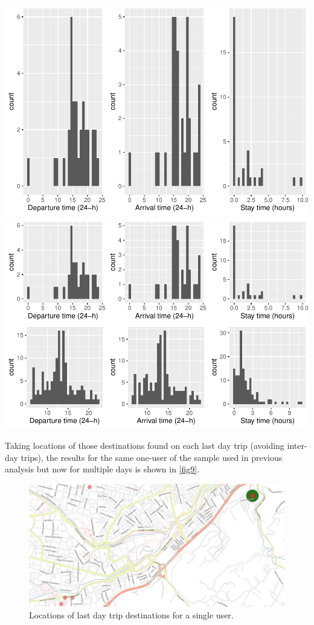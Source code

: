 \documentclass[]{elsarticle} %
\begin{document}
\includegraphics{Elsevier_files/figure-latex/homes-plot-1.pdf}
\includegraphics{Elsevier_files/figure-latex/homes-plot-2.pdf}

Taking locations of those destinations found on each last day trip
(avoiding inter-day trips), the results for the same one-user of the
sample used in previous analysis but now for multiple days is shown in
\ref{fig9}.

\begin{figure}
\includegraphics[width=0.9\linewidth]{../paper/images/homes} \caption{\label{fig9}Locations of last day trip destinations for a single user.}\label{fig:unnamed-chunk-10}
\end{figure}
\end{document}
